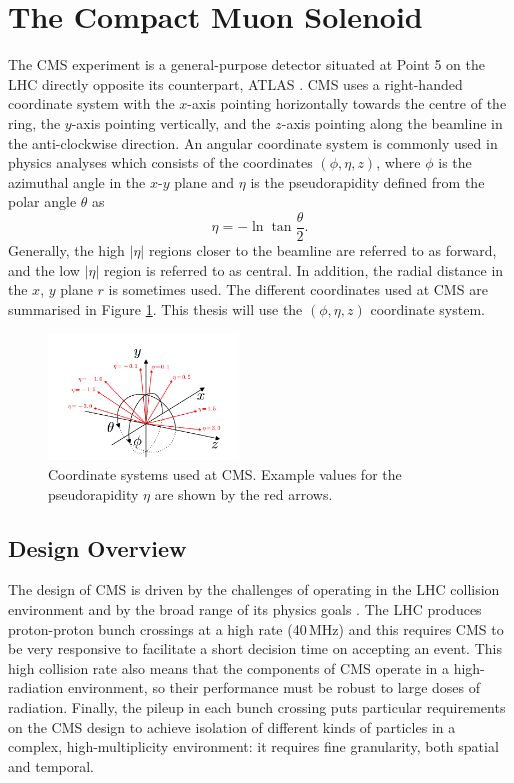 \section{The Compact Muon Solenoid}

The CMS experiment \cite{CMSatLHC} is a general-purpose detector situated at Point 5 on the LHC directly opposite its counterpart, ATLAS \cite{AtlasatLHC}. CMS uses a right-handed coordinate system with the $x$-axis pointing horizontally towards the centre of the ring, the $y$-axis pointing vertically, and the $z$-axis pointing along the beamline in the anti-clockwise direction. 
An angular coordinate system is commonly used in physics analyses which consists of the coordinates $(\phi,\eta,z)$, where $\phi$ is the azimuthal angle in the $x$-$y$ plane and $\eta$ is the pseudorapidity defined from the polar angle $\theta$ as
\begin{equation}
    \label{eq:apparatus:pseudorapidity}
    \eta = -\ln\tan{\frac{\theta}{2}}.
\end{equation}
Generally, the high $|\eta|$ regions closer to the beamline are referred to as forward, and the low $|\eta|$ region is referred to as central. 
In addition, the radial distance in the $x$, $y$ plane $r$ is sometimes used. The different coordinates used at CMS are summarised in Figure \ref{fig:apparatus:coords}. This thesis will use the $(\phi,\eta,z)$ coordinate system. 
\begin{figure}[h!]
    \includegraphics[width=0.45\textwidth]{figures/apparatus/CMS_coords.pdf}
    \caption{Coordinate systems used at CMS. Example values for the pseudorapidity $\eta$ are shown by the red arrows.}
    \label{fig:apparatus:coords}
\end{figure}

\subsection{Design Overview}
The design of CMS is driven by the challenges of operating in the LHC collision environment and by the broad range of its physics goals \cite{CMSPhysics}.
The LHC produces proton-proton bunch crossings at a high rate (40\,MHz) and this requires CMS to be very responsive to facilitate a short decision time on accepting an event. This high collision rate also means that the components of CMS operate in a high-radiation environment, so their performance must be robust to large doses of radiation. Finally, the pileup in each bunch crossing puts particular requirements on the CMS design to achieve isolation of different kinds of particles in a complex, high-multiplicity environment: it requires fine granularity, both spatial and temporal. 


